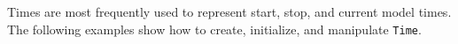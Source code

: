 
Times are most frequently used to represent start, stop, and current 
model times.  The following examples show how to create, initialize, and
manipulate {\tt Time}.


